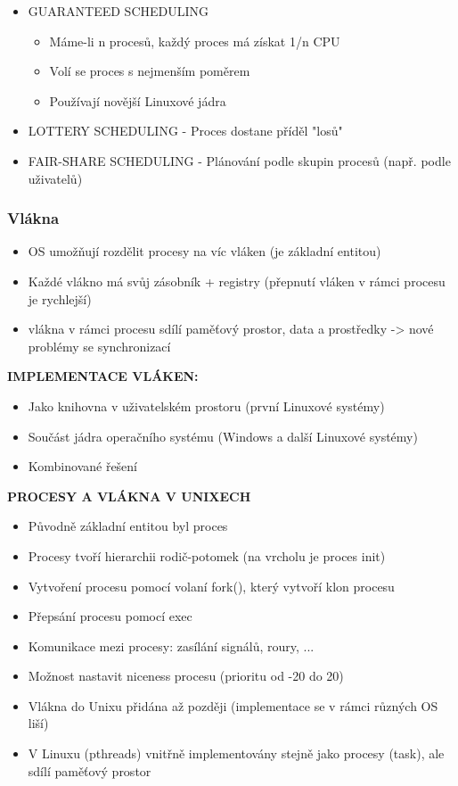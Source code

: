 \documentclass[10pt,a4paper]{article}
\begin{document}
\begin{itemize}
	\item GUARANTEED SCHEDULING
	\begin{itemize}
		\item Máme-li n procesů, každý proces má získat 1/n CPU
		\item Volí se proces s nejmenším poměrem
		\item Používají novější Linuxové jádra
	\end{itemize}
	\item LOTTERY SCHEDULING - Proces dostane příděl "losů"
	\item FAIR-SHARE SCHEDULING - Plánování podle skupin procesů (např. podle uživatelů)
\end{itemize}

\subsubsection{Vlákna}
\begin{itemize}
	\item OS umožňují rozdělit procesy na víc vláken (je základní entitou)
	\item Každé vlákno má svůj zásobník + registry (přepnutí vláken v rámci procesu je rychlejší)
	\item vlákna v rámci procesu sdílí paměťový prostor, data a prostředky -> nové problémy se synchronizací
\end{itemize}

\textbf{IMPLEMENTACE VLÁKEN:}
\begin{itemize}
	\item Jako knihovna v uživatelském prostoru (první Linuxové systémy)
	\item Součást jádra operačního systému (Windows a další Linuxové systémy)
	\item Kombinované řešení
\end{itemize}

\textbf{PROCESY A VLÁKNA V UNIXECH}
\begin{itemize}
	\item Původně základní entitou byl proces
	\item Procesy tvoří hierarchii rodič-potomek (na vrcholu je proces init)
	\item Vytvoření procesu pomocí volaní fork(), který vytvoří klon procesu
	\item Přepsání procesu pomocí exec
	\item Komunikace mezi procesy: zasílání signálů, roury, ...
	\item Možnost nastavit niceness procesu (prioritu od -20 do 20)
	\item Vlákna do Unixu přidána až později (implementace se v rámci různých OS liší)
	\item V Linuxu (pthreads) vnitřně implementovány stejně jako procesy (task), ale sdílí paměťový prostor
\end{itemize}
\end{document}
